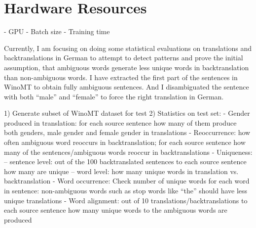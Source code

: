 \section{Hardware Resources}
\label{sec:Experiments:Hardware}
- GPU
- Batch size
- Training time


Currently, I am focusing on doing some statistical evaluations on translations and backtranslations in German to attempt to detect patterns and prove the initial assumption, that ambiguous words generate less unique words in backtranslation than non-ambiguous words. 
I have extracted the first part of the sentences in WinoMT to obtain fully ambiguous sentences. And I disambiguated the sentence with both “male” and “female” to force the right translation in German.

1) Generate subset of WinoMT dataset for test
2) Statistics on test set:
- Gender produced in translation: for each source sentence how many of them produce both genders, male gender and female gender in translations
- Reoccurrence: how often ambiguous word reoccurs in backtranslation; for each source sentence how many of the sentences/ambiguous words reoccur in backtranslations
- Uniqueness: 
-- sentence level: out of the 100 backtranslated sentences to each source sentence how many are unique
-- word level: how many unique words in translation vs. backtranslation
- Word occurrence: Check number of unique words for each word in sentence: non-ambiguous words such as stop words like “the” should have less unique translations 
- Word alignment: out of 10 translations/backtranslations to each source sentence how many unique words to the ambiguous words are produced

